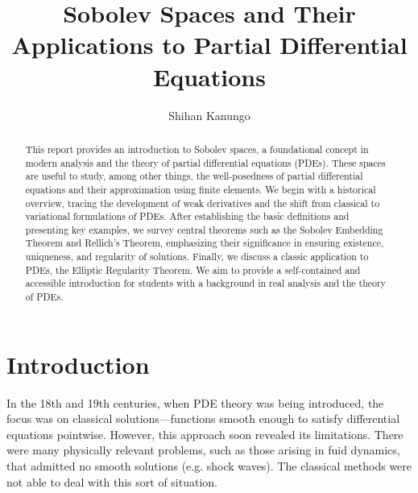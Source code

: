 \documentclass[12pt,letterpaper,reqno]{article}
\theoremstyle{plain}                              %
\theoremstyle{definition}                         %
\theoremstyle{remark}                             %
\numberwithin{equation}{section}
\begin{document}
 
\title{\bf Sobolev Spaces and Their Applications to Partial Differential Equations}


\author{Shihan Kanungo}




\date{}
\maketitle

\setcounter{page}{1}
\begin{abstract}
\noindent
    This report provides an introduction to Sobolev spaces, a foundational concept in modern analysis and the theory of partial differential equations (PDEs). These spaces are useful to study, among other things, the well-posedness of partial differential equations and their approximation using finite elements. We begin with a historical overview, tracing the development of weak derivatives and the shift from classical to variational formulations of PDEs. After establishing the basic definitions and presenting key examples, we survey central theorems such as the Sobolev Embedding Theorem and Rellich's Theorem, emphasizing their significance in ensuring existence, uniqueness, and regularity of solutions. Finally, we discuss a classic application to PDEs, the Elliptic Regularity Theorem. We aim to provide a self-contained and accessible introduction for students with a background in real analysis and the theory of PDEs.
\end{abstract}


\section{Introduction}
In the 18th and 19th centuries, when PDE theory was being introduced, the focus was on classical solutions---functions smooth enough to satisfy differential equations pointwise. However, this approach soon revealed its limitations. There were many physically relevant problems, such as those arising in fuid dynamics, that admitted no smooth solutions (e.g. shock waves). The classical methods were not able to deal with this sort of situation.
\end{document}
